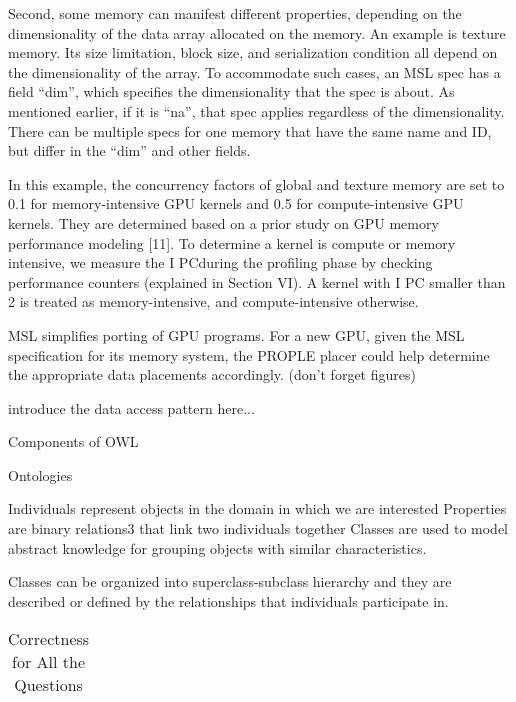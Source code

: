 \documentclass{sig-alternate}
\begin{document}
{Second, some memory can manifest different properties, depending on the dimensionality of the data array allocated on the memory. An example is texture memory. Its size limitation, block size, and serialization condition all depend on the dimensionality of the array. To accommodate such cases, an MSL spec has a field “dim”, which specifies the dimensionality that the spec is about. As mentioned earlier, if it is “na”, that spec applies regardless of the dimensionality. There can be multiple specs for one memory that have the same name and ID, but differ in the “dim” and other fields.

In this example, the concurrency factors of global and texture memory are set to 0.1 for memory-intensive GPU kernels and 0.5 for compute-intensive GPU kernels. They are determined based on a prior study on GPU memory performance modeling [11]. To determine a kernel is compute or memory intensive, we measure the I PCduring the profiling phase by checking performance counters (explained in Section VI). A kernel with I PC smaller than 2 is treated as memory-intensive, and compute-intensive otherwise.

MSL simplifies porting of GPU programs. For a new GPU, given the MSL specification for its memory system, the PROPLE placer could help determine the appropriate data placements accordingly. 
(don't forget figures)

introduce the data access pattern here...



Components of OWL 

Ontologies

Individuals represent objects in the domain in which we are interested
Properties are binary relations3 that link two individuals together
Classes are used to model abstract knowledge for grouping objects with similar characteristics.

Classes can be organized into superclass-subclass hierarchy and they are described or defined by the relationships that individuals participate in.

\begin{table*}

\centering

\caption{Correctness for All the Questions}

\begin{tabular}{|l|l|} \hline



\end{tabular}
\end{table*}}
\end{document}

